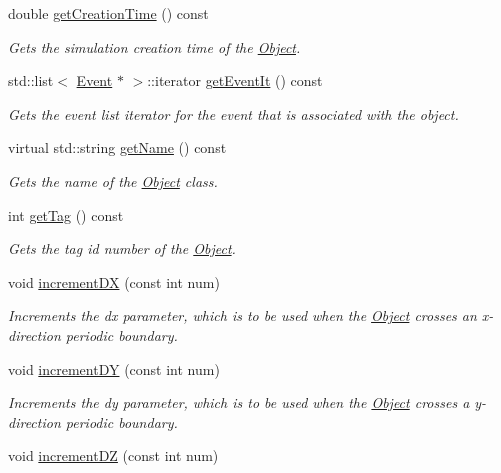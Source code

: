 \begin{DoxyCompactItemize}
double \hyperlink{class_object_a6f91c3f8b61cb9c9a8db662ac07d92e9}{get\+Creation\+Time} () const
\begin{DoxyCompactList}\small\item\em Gets the simulation creation time of the \hyperlink{class_object}{Object}. \end{DoxyCompactList}\item 
std\+::list$<$ \hyperlink{class_event}{Event} $\ast$ $>$\+::iterator \hyperlink{class_object_aa7c58e0319b7715c8d36f38ca7acf03e}{get\+Event\+It} () const
\begin{DoxyCompactList}\small\item\em Gets the event list iterator for the event that is associated with the object. \end{DoxyCompactList}\item 
virtual std\+::string \hyperlink{class_object_ade517616d51cd9ab581ec5afeb37b313}{get\+Name} () const
\begin{DoxyCompactList}\small\item\em Gets the name of the \hyperlink{class_object}{Object} class. \end{DoxyCompactList}\item 
int \hyperlink{class_object_aa9653577e8d0ac4b7b86d23d12f8b31b}{get\+Tag} () const
\begin{DoxyCompactList}\small\item\em Gets the tag id number of the \hyperlink{class_object}{Object}. \end{DoxyCompactList}\item 
void \hyperlink{class_object_a3d7c877f4aa179d9a56050c5faddc18d}{increment\+DX} (const int num)
\begin{DoxyCompactList}\small\item\em Increments the dx parameter, which is to be used when the \hyperlink{class_object}{Object} crosses an x-\/direction periodic boundary. \end{DoxyCompactList}\item 
void \hyperlink{class_object_a9df010818be72d15bad7985bf8a89ba0}{increment\+DY} (const int num)
\begin{DoxyCompactList}\small\item\em Increments the dy parameter, which is to be used when the \hyperlink{class_object}{Object} crosses a y-\/direction periodic boundary. \end{DoxyCompactList}\item 
void \hyperlink{class_object_a440b267c478f5d63db1954bdbd543408}{increment\+DZ} (const int num)

\end{DoxyCompactItemize}
